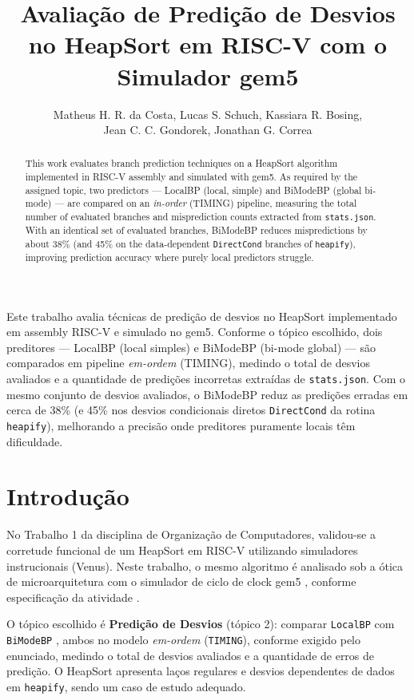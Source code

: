 \documentclass[12pt]{article}
\title{Avaliação de Predição de Desvios no HeapSort em {RISC-V} com o Simulador gem5}
\author{Matheus H. R. da Costa\inst{1}, Lucas S. Schuch\inst{1}, Kassiara R. Bosing\inst{1},\\
  Jean C. C. Gondorek\inst{1}, Jonathan G. Correa\inst{1}}
\begin{document}
\maketitle

\begin{abstract}
  This work evaluates branch prediction techniques on a HeapSort algorithm implemented in RISC-V assembly and simulated with gem5. As required by the assigned topic, two predictors --- LocalBP (local, simple) and BiModeBP (global bi-mode) --- are compared on an \emph{in-order} (TIMING) pipeline, measuring the total number of evaluated branches and misprediction counts extracted from \texttt{stats.json}. With an identical set of evaluated branches, BiModeBP reduces mispredictions by about 38\% (and 45\% on the data-dependent \texttt{DirectCond} branches of \texttt{heapify}), improving prediction accuracy where purely local predictors struggle.
\end{abstract}

\begin{resumo}
  Este trabalho avalia t{\'e}cnicas de predi{\c{c}}{\~a}o de desvios no HeapSort implementado em assembly RISC-V e simulado no gem5. Conforme o t{\'o}pico escolhido, dois preditores --- LocalBP (local simples) e BiModeBP (bi-mode global) --- s{\~a}o comparados em pipeline \emph{em-ordem} (TIMING), medindo o total de desvios avaliados e a quantidade de predi{\c{c}}{\~o}es incorretas extra{\'i}das de \texttt{stats.json}. Com o mesmo conjunto de desvios avaliados, o BiModeBP reduz as predi{\c{c}}{\~o}es erradas em cerca de 38\% (e 45\% nos desvios condicionais diretos \texttt{DirectCond} da rotina \texttt{heapify}), melhorando a precis{\~a}o onde preditores puramente locais t{\^e}m dificuldade.
\end{resumo}

\section{Introdução}

No Trabalho 1 da disciplina de Organização de Computadores, validou-se a corretude funcional de um HeapSort em RISC-V utilizando simuladores instrucionais (Venus). Neste trabalho, o mesmo algoritmo é analisado sob a ótica de microarquitetura com o simulador de ciclo de clock gem5 \cite{binkert2011gem5}, conforme especificação da atividade \cite{uffs2026org}.

O tópico escolhido é \textbf{Predição de Desvios} (tópico 2): comparar \texttt{LocalBP} com \texttt{BiModeBP} \cite{lee1997bi}, ambos no modelo \emph{em-ordem} (\texttt{TIMING}), conforme exigido pelo enunciado, medindo o total de desvios avaliados e a quantidade de erros de predição. O HeapSort apresenta laços regulares e desvios dependentes de dados em \texttt{heapify}, sendo um caso de estudo adequado.
\end{document}
